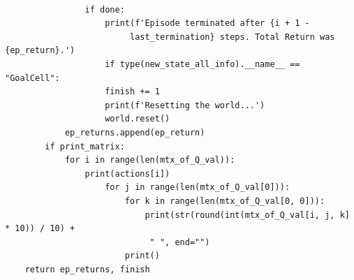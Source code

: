 \documentclass[a4paper, twoside, english]{article}
\begin{document}
\begin{lstlisting}[language=iPython]
				
				if done:
					print(f'Episode terminated after {i + 1 -
						 last_termination} steps. Total Return was {ep_return}.')
					if type(new_state_all_info).__name__ == "GoalCell":
					finish += 1
					print(f'Resetting the world...')
					world.reset()
			ep_returns.append(ep_return)
		if print_matrix:
			for i in range(len(mtx_of_Q_val)):
				print(actions[i])
					for j in range(len(mtx_of_Q_val[0])):
						for k in range(len(mtx_of_Q_val[0, 0])):
							print(str(round(int(mtx_of_Q_val[i, j, k] * 10)) / 10) +
							 " ", end="")
						print()
	return ep_returns, finish
\end{lstlisting}	
\end{document}
